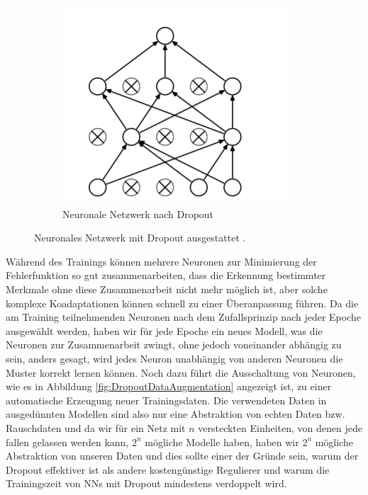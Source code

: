 \documentclass[12pt,a4paper]{scrartcl}
\numberwithin{equation}{section}
\begin{document}
\begin{figure}[h!]
\begin{subfigure}{.5\textwidth}
		\includegraphics[width=.8\linewidth, height=\linewidth, scale=2]{dropout2.png}
		\caption{Neuronale Netzwerk nach Dropout}
		\label{fig:dropout2}
	\end{subfigure}
	\caption{Neuronales Netzwerk mit Dropout ausgestattet \cite{3}.}
	\label{fig:Dropout}
\end{figure}

Während des Trainings können mehrere Neuronen zur Minimierung der Fehlerfunktion so gut zusammenarbeiten, dass die Erkennung bestimmter Merkmale ohne diese Zusammenarbeit nicht mehr möglich ist, aber solche komplexe Koadaptationen  können schnell zu einer Überanpassung führen. Da die am Training teilnehmenden Neuronen nach dem Zufallsprinzip nach jeder Epoche ausgewählt werden, haben wir für jede Epoche ein neues Modell, was die Neuronen zur Zusammenarbeit zwingt, ohne jedoch voneinander abhängig zu sein, anders gesagt, wird jedes Neuron unabhängig von anderen Neuronen die Muster korrekt lernen können.
Noch dazu führt die Ausschaltung von Neuronen, wie es in Abbildung \ref{fig:DropoutDataAugmentation} angezeigt ist, zu einer automatische Erzeugung neuer Trainingsdaten. Die verwendeten Daten in ausgedünnten Modellen sind also nur eine Abstraktion von echten Daten bzw. Rauschdaten und da wir für ein Netz mit $ n $ versteckten Einheiten, von denen jede fallen gelassen werden kann, $ 2^n $ mögliche Modelle haben, haben wir $ 2^n $ mögliche Abstraktion von unseren Daten und dies sollte einer der Gründe sein, warum der Dropout effektiver ist als andere kostengünstige Regulierer \cite{3} und warum die Trainingszeit von \acsp{NN} mit Dropout mindestens verdoppelt wird. 
	
\end{document}
